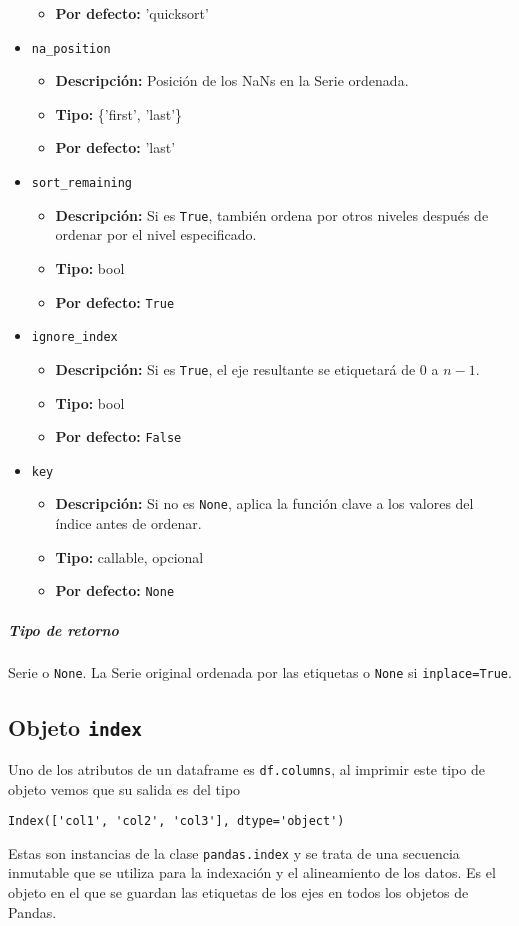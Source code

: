 \begin{itemize}
\begin{itemize}
\item \textbf{Por defecto:} 'quicksort'
\end{itemize}
\item \texttt{na\_position}
\begin{itemize}
\item \textbf{Descripción:} Posición de los NaNs en la Serie ordenada.
\item \textbf{Tipo:} \{'first', 'last'\}
\item \textbf{Por defecto:} 'last'
\end{itemize}
\item \texttt{sort\_remaining}
\begin{itemize}
\item \textbf{Descripción:} Si es \texttt{True}, también ordena por otros niveles después de ordenar por el nivel especificado.
\item \textbf{Tipo:} bool
\item \textbf{Por defecto:} \texttt{True}
\end{itemize}
\item \texttt{ignore\_index}
\begin{itemize}
\item \textbf{Descripción:} Si es \texttt{True}, el eje resultante se etiquetará de 0 a \( n - 1 \).
\item \textbf{Tipo:} bool
\item \textbf{Por defecto:} \texttt{False}
\end{itemize}
\item \texttt{key}
\begin{itemize}
\item \textbf{Descripción:} Si no es \texttt{None}, aplica la función clave a los valores del índice antes de ordenar.
\item \textbf{Tipo:} callable, opcional
\item \textbf{Por defecto:} \texttt{None}
\end{itemize}
\end{itemize}
\subparagraph{Tipo de retorno}
Serie o \texttt{None}. La Serie original ordenada por las etiquetas o \texttt{None} si \texttt{inplace=True}.
\subsection{Objeto \texttt{index}}
Uno de los atributos de un dataframe es \texttt{df.columns}, al imprimir este tipo de objeto vemos que su salida es del tipo 
\begin{verbatim}
Index(['col1', 'col2', 'col3'], dtype='object')
\end{verbatim}
Estas son instancias de la clase \texttt{pandas.index} y se trata de una secuencia inmutable que se utiliza para la indexación y el alineamiento de los datos. Es el objeto en el que se guardan las etiquetas de los ejes en todos los objetos de Pandas. 
